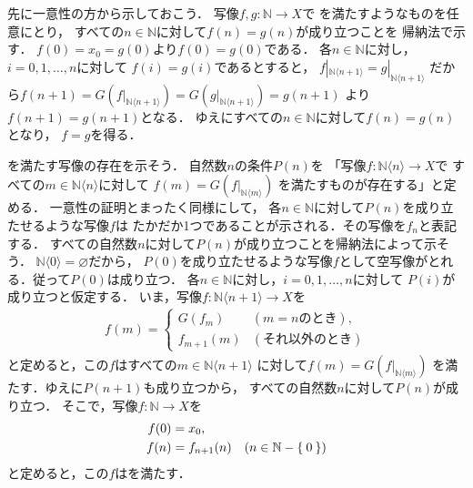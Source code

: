 \documentclass[11pt,a4paper]{ltjsarticle} %
\makeatletter
\theoremstyle{mystyle} %
\renewenvironment{proof}[1][\proofname]{\par
  \pushQED{\qed}%
  \normalfont \topsep6\p@\@plus6\p@\relax
  \trivlist
\item[\hskip\labelsep
  \itshape
  #1]\ignorespaces%
  }{%
  \popQED\endtrivlist\@endpefalse
}
\renewcommand{\proofname}{\textbf{［証明］}}
\makeatother
\begin{document}
\begin{proof}
  先に一意性の方から示しておこう．
  写像$f,g \colon \mathbb{N} \longrightarrow X$で
  を満たすようなものを任意にとり，
  すべての$n \in \mathbb{N}$に対して$f(n) = g(n)$が成り立つことを
  帰納法で示す．
  $f(0) = x_0 = g(0)$より$f(0)=g(0)$である．
  各$n \in \mathbb{N}$に対し，$i= 0,1, \ldots, n$に対して
  $f(i)=g(i)$であるとすると，
  $f|_{\mathbb{N} \langle n+1 \rangle} = g|_{\mathbb{N} \langle n+1 \rangle} $
  だから$f(n+1) = G \left( f|_{\mathbb{N} \langle n+1 \rangle} \right) =
  G \left ( g |_{\mathbb{N} \langle n+1 \rangle} \right) = g(n+1)$
  より$f(n+1) =g(n+1)$となる．
  ゆえにすべての$n \in \mathbb{N}$に対して$f(n) = g(n)$となり，
  $f=g$を得る．

  を満たす写像の存在を示そう．
  自然数$n$の条件$P(n)$を
  「写像$f \colon \mathbb{N} \langle n \rangle \longrightarrow X$で
  すべての$m \in \mathbb{N} \langle n \rangle$に対して
  $f(m) = G \left( f|_{\mathbb{N} \langle m \rangle } \right)$
  を満たすものが存在する」と定める．
  一意性の証明とまったく同様にして，
  各$n \in \mathbb{N}$に対して$P(n)$を成り立たせるような写像$f$は
  たかだか1つであることが示される．その写像を$f_n$と表記する．
  すべての自然数$n$に対して$P(n)$が成り立つことを帰納法によって示そう．
  $\mathbb{N} \langle 0 \rangle = \varnothing$だから，
  $P(0)$を成り立たせるような写像$f$として空写像がとれる．従って$P(0)$は成り立つ．
  各$n \in \mathbb{N}$に対し，$i=0,1,\ldots,n$に対して
  $P(i)$が成り立つと仮定する．
  いま，写像$f \colon \mathbb{N} \langle n+1 \rangle \longrightarrow X$を
  \begin{align*}
    f (m) = 
    \begin{cases}
      G \left( f_{m} \right) & ( \text{$m=n$のとき} ) , \\
      f_{m+1} (m) & (\text{それ以外のとき})
    \end{cases}
  \end{align*}
  と定めると，この$f$はすべての$m \in \mathbb{N} \langle n+1 \rangle$
  に対して$f(m) = G \left( f|_{\mathbb{N} \langle m \rangle} \right)$
  を満たす．ゆえに$P(n+1)$も成り立つから，
  すべての自然数$n$に対して$P(n)$が成り立つ．
  そこで，写像$f \colon \mathbb{N} \longrightarrow X$を
  \begin{align*}
    f(0) & = x_0 , \\ 
    f(n) & = f_{n+1} (n) \quad ( n \in \mathbb{N} - \Set{0})
  \end{align*}
  と定めると，この$f$はを満たす．
\end{proof}

%
\printbibliography[title=参考文献]
\end{document}
